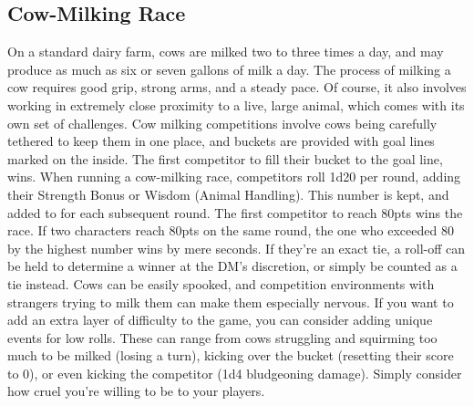 \documentclass[10pt,a4paper,twoside,twocolumn,openany,bg=print,nodeprecatedcode]{dndbook}
\begin{document}
\subsection{Cow-Milking Race}
On a standard dairy farm, cows are milked two to three times a day, and may produce as much as six or seven gallons of milk a day. The process of milking a cow requires good grip, strong arms, and a steady pace. Of course, it also involves working in extremely close proximity to a live, large animal, which comes with its own set of challenges. Cow milking competitions involve cows being carefully tethered to keep them in one place, and buckets are provided with goal lines marked on the inside. The first competitor to fill their bucket to the goal line, wins.
When running a cow-milking race, competitors roll 1d20 per round, adding their Strength Bonus or Wisdom (Animal Handling). This number is kept, and added to for each subsequent round. The first competitor to reach 80pts wins the race. If two characters reach 80pts on the same round, the one who exceeded 80 by the highest number wins by mere seconds. If they're an exact tie, a roll-off can be held to determine a winner at the DM's discretion, or simply be counted as a tie instead.
Cows can be easily spooked, and competition environments with strangers trying to milk them can make them especially nervous. If you want to add an extra layer of difficulty to the game, you can consider adding unique events for low rolls. These can range from cows struggling and squirming too much to be milked (losing a turn), kicking over the bucket (resetting their score to 0), or even kicking the competitor (1d4 bludgeoning damage). Simply consider how cruel you're willing to be to your players.
\end{document}
